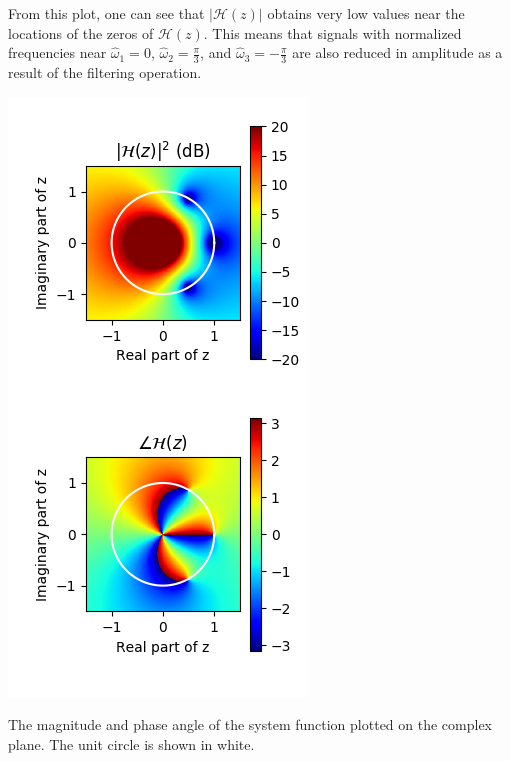 From this plot, one can see that $|\mathcal{H}(z)|$ obtains very low
values near the locations of the zeros of $\mathcal{H}(z)$. This means
that signals with normalized frequencies near $\hat{\omega}_1=0$,
$\hat{\omega}_2=\frac{\pi}{3}$, and $\hat{\omega}_3=-\frac{\pi}{3}$
are also reduced in amplitude as a result of the filtering operation.

\begin{marginfigure}
  \begin{center}
    \includegraphics[width=\textwidth]{code/025_system_function/z_mag_angle.png}
  \end{center}
  \caption{The magnitude and phase angle of the system function plotted on the complex plane. The unit circle is shown in white.}
  \label{fig:third_order_pz}
\end{marginfigure}

